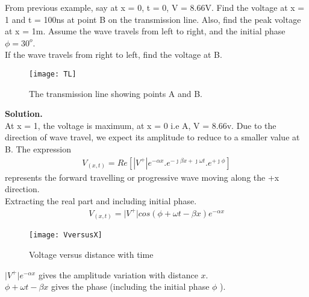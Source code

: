 \begin{exmp}
	From previous example, say at x = 0, t = 0, V = 8.66V. Find the voltage at x = 1 and  t = 100ns at point B on the transmission line. Also, find the peak voltage at x = 1m. Assume the wave travels from left to right, and the initial phase $\phi = 30^o$.\\
	If the wave travels from right to left, find the voltage at B.
	\begin{figure}[h]
		\centering
		\texttt{[image: TL]}
		\caption{The transmission line showing points A and B.}
	\end{figure}

	\textbf{Solution.} \\ 
	At x = 1, the voltage is maximum, at x = 0 i.e A, V = 8.66v. Due to the direction of wave travel, we expect its amplitude to reduce to a smaller value at B. The expression
	\begin{align}
	V_{(x,t)} = Re{[\left| V^+\right|  e^{-\alpha x}.e^{-\jmath\beta x + \jmath\omega t}.e^{+\jmath\phi}]} 
	\end{align}
	represents the forward travelling or progressive wave moving along the +x direction.\\
	Extracting the real part and including initial phase.
	\begin{align*}
	V_{(x,t)} = \lvert V^+\rvert cos(\phi + \omega t - \beta x)e^{-\alpha x}
	\end{align*}
	\begin{figure}[h]
		\centering
		\texttt{[image: VversusX]}
		\caption{Voltage versus distance with time}
	\end{figure}

	$\lvert V^+\rvert e^{-\alpha x} $ gives the amplitude variation with distance $ x $. \\
	$ \phi + \omega t - \beta x $ gives the phase (including the initial phase $ \phi $ ).\\
	

\end{exmp}
